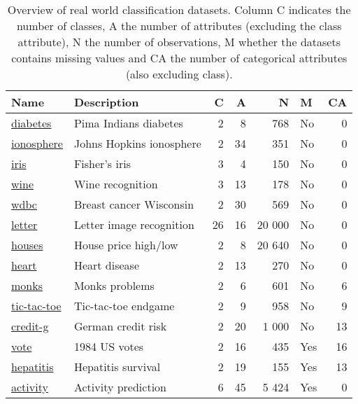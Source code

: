 \begin{table}
\centering
\begin{tabular}[htp]{ l l r r r l r }
    Name & Description & C & A & N & M & CA \\ \hline
    \href{https://www.openml.org/d/37}{diabetes} & Pima Indians diabetes & 2 & 8 & 768 & No & 0 \\
    \href{https://www.openml.org/d/59}{ionosphere} & Johns Hopkins ionosphere & 2 & 34 & 351 & No & 0 \\
    \href{https://www.openml.org/d/61}{iris} & Fisher's iris & 3 & 4 & 150 & No & 0 \\
    \href{https://www.openml.org/d/187}{wine} & Wine recognition & 3 & 13 & 178 & No & 0 \\
    \href{https://www.openml.org/d/1510}{wdbc} & Breast cancer Wisconsin & 2 & 30 & 569 & No & 0 \\
    \href{https://www.openml.org/d/6}{letter} & Letter image recognition & 26 & 16 & 20 000 & No & 0 \\
    \href{https://www.openml.org/d/823}{houses} & House price high/low & 2 & 8 & 20 640 & No & 0 \\
    \href{https://www.openml.org/d/53}{heart} & Heart disease & 2 & 13 & 270 & No & 0 \\
    \href{https://www.openml.org/d/334}{monks} & Monks problems & 2 & 6 & 601 & No & 6 \\
    \href{https://www.openml.org/d/50}{tic-tac-toe} & Tic-tac-toe endgame & 2 & 9 & 958 & No & 9 \\
    \href{https://www.openml.org/d/31}{credit-g} & German credit risk & 2 & 20 & 1 000 & No & 13 \\
    \href{https://www.openml.org/d/56}{vote} & 1984 US votes & 2 & 16 & 435 & Yes & 16 \\
    \href{https://www.openml.org/d/55}{hepatitis} & Hepatitis survival & 2 & 19 & 155 & Yes & 13 \\
    \href{http://www.cis.fordham.edu/wisdm/dataset.php}{activity} & Activity prediction & 6 & 45 & 5 424 & Yes & 0 \\
\end{tabular}
\caption{Overview of real world classification datasets. Column C indicates the number of classes, A the number of attributes (excluding the class attribute), N the number of observations, M whether the datasets contains missing values and CA the number of categorical attributes (also excluding class).}%
\label{tbl:datasets}
\end{table}


